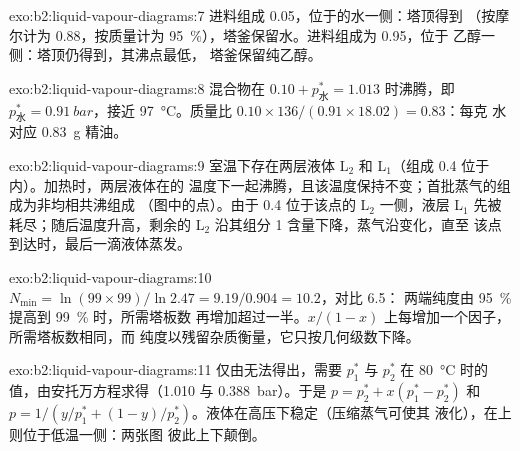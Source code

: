 \begin{solution}{exo:b2:liquid-vapour-diagrams:7}
进料组成 0.05，位于的水一侧：塔顶得到
（按摩尔计为 0.88，按质量计为 95~\%），塔釜保留水。进料组成为 0.95，位于
乙醇一侧：塔顶仍得到，其沸点最低，
塔釜保留纯乙醇。
\end{solution}

\begin{solution}{exo:b2:liquid-vapour-diagrams:8}
混合物在 $0.10 + p^*_{\text{水}} = 1.013$ 时沸腾，即
$p^*_{\text{水}} = \qty{0.91}{bar}$，接近 \qty{97}{\degreeCelsius}。质量比
$0.10 \times 136/(0.91 \times 18.02) = 0.83$：每克
水对应 \qty{0.83}{g} 精油。
\end{solution}

\begin{solution}{exo:b2:liquid-vapour-diagrams:9}
室温下存在两层液体 L$_2$ 和 L$_1$（组成 0.4 位于
内）。加热时，两层液体在的
温度下一起沸腾，且该温度保持不变；首批蒸气的组成为非均相共沸组成
（图中的点）。由于 0.4 位于该点的 L$_2$ 一侧，液层
L$_1$ 先被耗尽；随后温度升高，剩余的 L$_2$
沿其组分 1 含量下降，蒸气沿变化，直至
该点到达时，最后一滴液体蒸发。
\end{solution}

\begin{solution}{exo:b2:liquid-vapour-diagrams:10}
$N_{\min} = \ln(99 \times 99)/\ln 2.47 = 9.19/0.904 = 10.2$，对比 6.5：
两端纯度由 95~\% 提高到 99~\% 时，所需塔板数
再增加超过一半。$x/(1 - x)$ 上每增加一个因子，所需塔板数相同，而
纯度以残留杂质衡量，它只按几何级数下降。
\end{solution}

\begin{solution}{exo:b2:liquid-vapour-diagrams:11}
仅由无法得出，需要 $p_1^*$ 与 $p_2^*$ 在
\qty{80}{\degreeCelsius} 时的值，由安托万方程求得（1.010 与
\qty{0.388}{bar}）。于是 $p = p_2^* + x(p_1^* - p_2^*)$ 和 $p = 1/(y/p_1^* + (1 -
y)/p_2^*)$。液体在高压下稳定（压缩蒸气可使其
液化），在上则位于低温一侧：两张图
彼此上下颠倒。
\end{solution}

